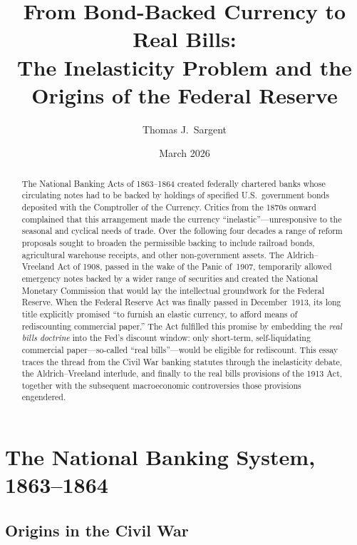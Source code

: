 \documentclass[12pt]{article}
\title{\textbf{From Bond-Backed Currency to Real Bills:\\
The Inelasticity Problem and the Origins of the Federal Reserve}}
\author{Thomas J.\ Sargent}
\date{March 2026}
\begin{document}
\maketitle

\begin{abstract}
\noindent
The National Banking Acts of 1863--1864 created federally chartered banks whose
circulating notes had to be backed by holdings of specified U.S.\ government bonds
deposited with the Comptroller of the Currency.  Critics from the 1870s onward
complained that this arrangement made the currency ``inelastic''---unresponsive to
the seasonal and cyclical needs of trade.  Over the following four decades a range
of reform proposals sought to broaden the permissible backing to include railroad
bonds, agricultural warehouse receipts, and other non-government assets.  The
Aldrich--Vreeland Act of 1908, passed in the wake of the Panic of~1907, temporarily
allowed emergency notes backed by a wider range of securities and created the
National Monetary Commission that would lay the intellectual groundwork for the
Federal Reserve.  When the Federal Reserve Act was finally passed in December~1913,
its long title explicitly promised ``to furnish an elastic currency, to afford means
of rediscounting commercial paper.''  The Act fulfilled this promise by embedding
the \emph{real bills doctrine} into the Fed's discount window: only short-term,
self-liquidating commercial paper---so-called ``real bills''---would be eligible
for rediscount.  This essay traces the thread from the Civil War banking statutes
through the inelasticity debate, the Aldrich--Vreeland interlude, and finally to
the real bills provisions of the 1913 Act, together with the subsequent macroeconomic
controversies those provisions engendered.
\end{abstract}

\tableofcontents
\newpage

\section{The National Banking System, 1863--1864}
\label{sec:national-banking}

\subsection{Origins in the Civil War}
\end{document}
